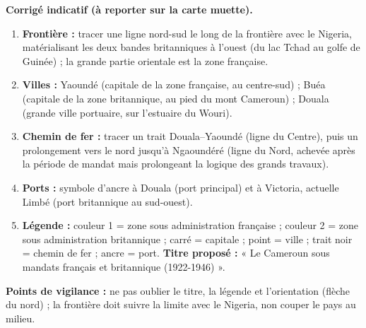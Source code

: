 \documentclass[11pt]{article}
\begin{document}
\begin{corrige}
\textbf{Corrigé indicatif (à reporter sur la carte muette).}

\begin{enumerate}
\item \textbf{Frontière :} tracer une ligne nord-sud le long de la frontière avec le Nigeria, matérialisant les deux bandes britanniques à l'ouest (du lac Tchad au golfe de Guinée) ; la grande partie orientale est la zone française.
\item \textbf{Villes :} Yaoundé (capitale de la zone française, au centre-sud) ; Buéa (capitale de la zone britannique, au pied du mont Cameroun) ; Douala (grande ville portuaire, sur l'estuaire du Wouri).
\item \textbf{Chemin de fer :} tracer un trait Douala--Yaoundé (ligne du Centre), puis un prolongement vers le nord jusqu'à Ngaoundéré (ligne du Nord, achevée après la période de mandat mais prolongeant la logique des grands travaux).
\item \textbf{Ports :} symbole d'ancre à Douala (port principal) et à Victoria, actuelle Limbé (port britannique au sud-ouest).
\item \textbf{Légende :} couleur 1 = zone sous administration française ; couleur 2 = zone sous administration britannique ; carré = capitale ; point = ville ; trait noir = chemin de fer ; ancre = port. \textbf{Titre proposé :} « Le Cameroun sous mandats français et britannique (1922-1946) ».
\end{enumerate}

\textbf{Points de vigilance :} ne pas oublier le titre, la légende et l'orientation (flèche du nord) ; la frontière doit suivre la limite avec le Nigeria, non couper le pays au milieu.
\end{corrige}
\end{document}
